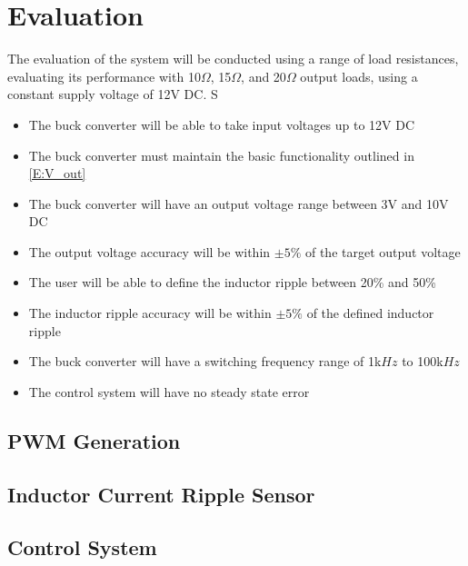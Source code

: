 \chapter{Evaluation}\label{C:evaluation}


The evaluation of the system will be conducted using a range of load resistances, evaluating its performance with 10$\Omega$, 15$\Omega$, and 20$\Omega$ output loads, using a constant supply voltage of 12V DC.
S
\begin{itemize}
	\item The buck converter will be able to take input voltages up to 12V DC
	
	\item The buck converter must maintain the basic functionality outlined in \cref{E:V_out}

	\item The buck converter will have an output voltage range between 3V and 10V DC
	
	\item The output voltage accuracy will be within $\pm 5\%$ of the target output voltage

	\item The user will be able to define the inductor ripple between 20\% and 50\%
	
	\item The inductor ripple accuracy will be within $\pm 5\%$ of the defined inductor ripple
	
	\item The buck converter will have a switching frequency range of 1k$Hz$ to 100k$Hz$

	\item The control system will have no steady state error

\end{itemize}


\section{PWM Generation}\label{S:pwm_gen_eval}


\section{Inductor Current Ripple Sensor}\label{S:current_sense_eval}


\section{Control System}\label{S:control_eval}